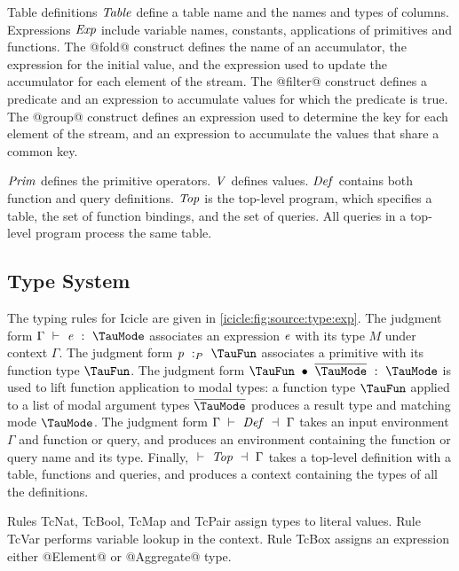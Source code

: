 Table definitions $\mathit{Table}$ define a table name and the names and types of columns.
Expressions $\mathit{Exp}$ include variable names, constants, applications of primitives and functions.
The @fold@ construct defines the name of an accumulator, the expression for the initial value, and the expression used to update the accumulator for each element of the stream.
The @filter@ construct defines a predicate and an expression to accumulate values for which the predicate is true.
The @group@ construct defines an expression used to determine the key for each element of the stream, and an expression to accumulate the values that share a common key.

$\mathit{Prim}$ defines the primitive operators.
$\mathit{V}$ defines values.
$\mathit{Def}$ contains both function and query definitions.
$\mathit{Top}$ is the top-level program, which specifies a table, the set of function bindings, and the set of queries.
All queries in a top-level program process the same table.


\subsection{Type System}
\label{icicle:s:ElementsAndAggregates:TypeSystem}



The typing rules for Icicle are given in \cref{icicle:fig:source:type:exp}.
The judgment form $\Typecheck{\Gamma}{\mi{e}}{\TauMode}$ associates an expression $\mathit{e}$ with its type $M$ under context $\Gamma$.
The judgment form $\TypecheckP{\mi{p}}{\TauFun}$ associates a primitive with its function type $\TauFun$.
The judgment form $\TypecheckApp{\TauFun}{\ov{\TauMode}}{\TauMode}$ is used to lift function application to modal types: a function type $\TauFun$ applied to a list of modal argument types $\ov{\TauMode}$ produces a result type and matching mode $\TauMode$.
The judgment form $\TypecheckS{\Gamma}{\mi{Def}}{\Gamma}$ takes an input environment $\Gamma$ and function or query, and produces an environment containing the function or query name and its type.
Finally, $\TypecheckS{}{\mi{Top}}{\Gamma}$ takes a top-level definition with a table, functions and queries, and produces a context containing the types of all the definitions.


Rules TcNat, TcBool, TcMap and TcPair assign types to literal values.
Rule TcVar performs variable lookup in the context.
Rule TcBox assigns an expression either @Element@ or @Aggregate@ type. 

